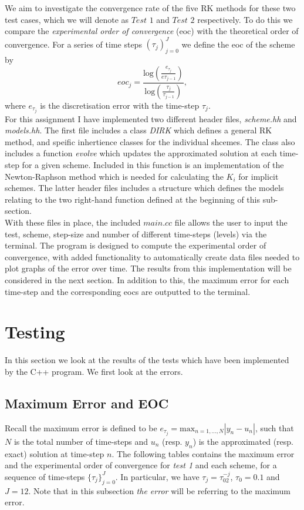 \documentclass[10pt]{article}
\begin{document}
We aim to investigate the convergence rate of the five RK methods for these two test cases, which we will denote as $\textit{Test 1}$ and $\textit{Test 2}$ respectively. To do this we compare the \textit{experimental order of convergence} (eoc) with the theoretical order of convergence. For a series of time steps $(\tau_j)_{j=0}^J$ we define the eoc of the scheme by
\[
eoc_j = \frac{\text{log}(\frac{e_{\tau_j}}{e{\tau_{j-1}}})}{\text{log}(\frac{\tau_j}{\tau_{j-1}})},
\]
where $e_{\tau_j}$ is the discretisation error with the time-step $\tau_j$. \\

For  this  assignment  I  have  implemented  two different header files, \textit{scheme.hh} and \textit{models.hh}. The first file includes a class \textit{DIRK} which defines a general RK method, and speific inhertience classes for the individual shcemes. The class also includes a function \textit{evolve} which updates the approximated solution at each time-step for a given scheme. Included in this function is an implementation of the Newton-Raphson method which is needed for calculating the $K_i$ for implicit schemes. The latter header files includes a structure which defines the models relating to the two right-hand function defined at the beginning of this sub-section.\\

With these files in place, the included $\textit{main.cc}$ file allows the user to input the test, scheme, step-size and number of different time-steps (levels) via the terminal. The program is designed to compute the experimental order of convergence, with added functionality to automatically create data files needed to plot graphs of the error over time. The results from this implementation will be considered in the next section. In addition to this, the maximum error for each time-step and the corresponding eocs are outputted to the terminal.

\section{Testing}

In this section we look at the results of the tests which have been implemented by the C++ program. We first look at the errors.

\subsection{Maximum Error and EOC}
Recall the maximum error is defined to be $e_{\tau_j} = \text{max}_{n=1,...,N}|y_n - u_n|$, such that $N$ is the total number of time-steps and $u_n$ (resp. $y_n$) is the approximated (resp. exact) solution at time-step $n$. The following tables contains the maximum error and the experimental order of convergence for \textit{test 1} and each scheme, for a sequence of time-steps $\{\tau_j\}_{j=0}^{J}$. In particular, we have $\tau_j = \tau_02^{-j}$, $\tau_0 = 0.1$ and $J=12$. Note that in this subsection \textit{the error} will be referring to the maximum error.\\
\end{document}
